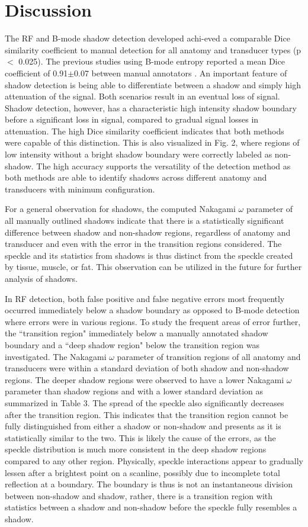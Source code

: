 \documentclass[authoryear,preprint,review,12pt]{elsarticle}
\begin{document}
\section*{Discussion}
\label{Discuss}
The RF and B-mode shadow detection developed achi-eved a comparable Dice similarity coefficient to manual detection for all anatomy and transducer types (p $<$ 0.025). The previous studies using B-mode entropy reported a mean Dice coefficient of 0.91$\pm$0.07 between manual annotators  \citep{Hellier2010}. An important feature of shadow detection is being able to differentiate between a shadow and simply high attenuation of the signal. Both scenarios result in an eventual loss of signal. Shadow detection, however, has a characteristic high intensity shadow boundary before a significant loss in signal, compared to gradual signal losses in attenuation. The high Dice similarity coefficient indicates that both methods were capable of this distinction. This is also visualized in Fig. 2, where regions of low intensity without a bright shadow boundary were correctly labeled as non-shadow. The high accuracy supports the versatility of the detection method as both methods are able to identify shadows across different anatomy and transducers with minimum configuration. 

For a general observation for shadows, the computed Nakagami $\omega$ parameter of all manually outlined shadows indicate that there is a statistically significant difference between shadow and non-shadow regions, regardless of anatomy and transducer and even with the error in the transition regions considered. The speckle and its statistics from shadows is thus distinct from the speckle created by tissue, muscle, or fat. This observation can be utilized in the future for further analysis of shadows. 

In RF detection, both false positive and false negative errors most frequently occurred immediately below a shadow boundary as opposed to B-mode detection where errors were in various regions. To study the frequent areas of error further, the ``transition region" immediately below a manually annotated shadow boundary and a ``deep shadow region" below the transition region was investigated. The Nakagami $\omega$ parameter of transition regions  of all anatomy and transducers were within a standard deviation of both shadow and non-shadow regions. The deeper shadow regions were observed to have a lower Nakagami $\omega$ parameter than shadow regions and with a lower standard deviation as summarized in Table 3. The spread of the speckle also significantly decreases after the transition region. This indicates that the transition region cannot be fully distinguished from either a shadow or non-shadow and presents as it is statistically similar to the two. This is likely the cause of the errors, as the speckle distribution is much more consistent in the deep shadow regions compared to any other region. Physically, speckle interactions appear to gradually lessen after a brightest point on a scanline, possibly due to incomplete total reflection at a boundary. The boundary is thus is not an instantaneous division between non-shadow and shadow, rather, there is a transition region with statistics between a shadow and non-shadow before the speckle fully resembles a shadow.
\end{document}
